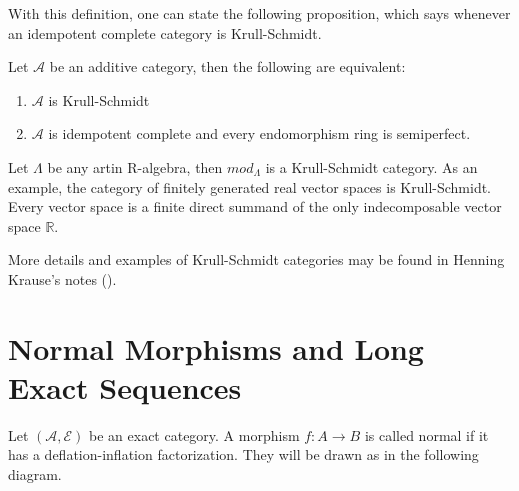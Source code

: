     With this definition, one can state the following proposition, which says whenever an idempotent complete category is Krull-Schmidt.

    \begin{prop}
        Let $\mathcal{A}$ be an additive category, then the following are equivalent:
        \begin{enumerate}
            \item $\mathcal{A}$ is Krull-Schmidt
            \item $\mathcal{A}$ is idempotent complete and every endomorphism ring is semiperfect.
        \end{enumerate}
    \end{prop}




    \begin{example}
        Let $\Lambda$ be any artin R-algebra, then $mod_{\Lambda}$ is a Krull-Schmidt category. As an example, the category of finitely generated real vector spaces is Krull-Schmidt. Every vector space is a finite direct summand of the only indecomposable vector space $\mathbb{R}$.
    \end{example}

    More details and examples of Krull-Schmidt categories may be found in Henning Krause's notes (\cite{Kra12}).

\section{Normal Morphisms and Long Exact Sequences}
    
    \begin{definition}
        Let $(\mathcal{A},\mathcal{E})$ be an exact category. A morphism $f:A\rightarrow B$ is called normal if it has a deflation-inflation factorization. They will be drawn as in the following diagram.
        \begin{center}
        \end{center}
    \end{definition}

